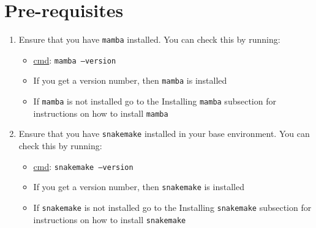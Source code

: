 \documentclass{article}
\begin{document}
    \section{Pre-requisites}
    \begin{enumerate}
        \item Ensure that you have \texttt{mamba} installed. You can check this by running:
            \begin{itemize}
                \item \underline{cmd}: \texttt{mamba --version}
                \item If you get a version number, then \texttt{mamba} is installed
                \item If \texttt{mamba} is not installed go to the Installing \texttt{mamba} subsection for instructions on how to install \texttt{mamba}
            \end{itemize}

        \item Ensure that you have \texttt{snakemake} installed in your base environment. You can check this by running:
            \begin{itemize}
                \item \underline{cmd}: \texttt{snakemake --version}
                \item If you get a version number, then \texttt{snakemake} is installed
                \item If \texttt{snakemake} is not installed go to the Installing \texttt{snakemake} subsection for instructions on how to install \texttt{snakemake}
            \end{itemize}
    \end{enumerate}
\end{document}
